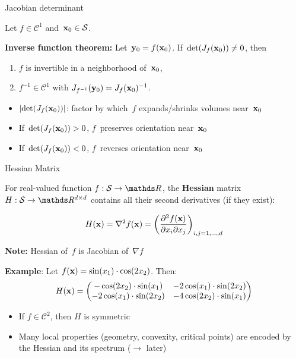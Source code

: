 \documentclass[11pt,compress,t,notes=noshow, xcolor=table]{beamer}
\begin{document}
\begin{vbframe}{Jacobian determinant}

Let $f\in\mathcal{C}^1$ and~$\mathbf{x}_0\in\mathcal{S}$.

\begin{kframe}
    \textbf{Inverse function theorem:} Let~$\mathbf{y}_0=f(\mathbf{x}_0)$.
        If~$\det(J_f(\mathbf{x}_0))\not=0$, then
        \begin{enumerate}
            \item $f$ is invertible in a neighborhood of~$\mathbf{x}_0$,
            \item $f^{-1}\in\mathcal{C}^1$ with $J_{f^{-1}}(\mathbf{y}_0) = J_f(\mathbf{x}_0)^{-1}$.
        \end{enumerate}
\end{kframe}

\begin{itemize}
    \item $|{\det(J_f(\mathbf{x}_0))}|$: factor by which~$f$ expands/shrinks volumes near~$\mathbf{x}_0$
    \item If~$\det(J_f(\mathbf{x}_0))>0$, $f$~preserves orientation near~$\mathbf{x}_0$
    \item If~$\det(J_f(\mathbf{x}_0))<0$, $f$~reverses orientation near~$\mathbf{x}_0$
\end{itemize}

\end{vbframe}


\begin{vbframe}{Hessian Matrix}

For real-valued function $f:\mathcal{S} \to \R$, the \textbf{Hessian} matrix $H:\mathcal{S} \to \R^{d \times d}$ contains all their second derivatives (if they exist):

\begin{equation*}
    H(\mathbf{x}) =\nabla^2 f(\mathbf{x}) = \left(\frac{\partial^2 f(\mathbf{x})}{\partial x_i \partial x_j}\right)_{i,j=1,\ldots,d}
\end{equation*}
  
\medskip

\textbf{Note:} Hessian of~$f$ is Jacobian of~$\nabla f$

\medskip

\textbf{Example}: Let $f(\mathbf{x}) = \sin(x_1) \cdot \cos(2x_2)$.
Then:
\begin{equation*}
    H(\mathbf{x}) = \begin{pmatrix}
        -\cos(2x_2)\cdot\sin(x_1) & -2\cos(x_1)\cdot\sin(2x_2) \\
        -2\cos(x_1)\cdot\sin(2x_2) & -4\cos(2x_2)\cdot\sin(x_1) 
    \end{pmatrix}
\end{equation*}

\begin{itemize}
    \item If $f\in\mathcal{C}^2$, then $H$ is symmetric
    \item Many local properties (geometry, convexity, critical points) are encoded by the Hessian and its spectrum ($\rightarrow$ later)
\end{itemize}

\end{vbframe}
\end{document}
